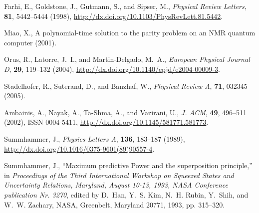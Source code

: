 \begin{thebibliography}{10}
Farhi, E., Goldstone, J., Gutmann, S., and Sipser, M., \emph{Physical Review
  Letters}, \textbf{81}, 5442--5444 (1998),
  \urlprefix\url{http://dx.doi.org/10.1103/PhysRevLett.81.5442}.

Miao, X., A polynomial-time solution to the parity problem on an {NMR} quantum
  computer (2001).

Orus, R., Latorre, J.~I., and Martin-Delgado, M.~A., \emph{European Physical
  Journal D}, \textbf{29}, 119--132 (2004),
  \urlprefix\url{http://dx.doi.org/10.1140/epjd/e2004-00009-3}.

Stadelhofer, R., Suterand, D., and Banzhaf, W., \emph{Physical Review A},
  \textbf{71}, 032345 (2005).

Ambainis, A., Nayak, A., Ta-Shma, A., and Vazirani, U., \emph{J. ACM},
  \textbf{49}, 496--511 (2002), ISSN 0004-5411,
  \urlprefix\url{http://dx.doi.org/10.1145/581771.581773}.

Summhammer, J., \emph{Physics Letters A}, \textbf{136}, 183--187 (1989),
  \urlprefix\url{http://dx.doi.org/10.1016/0375-9601(89)90557-4}.

Summhammer, J., \enquote{Maximum predictive Power and the superposition
  principle,} in \emph{Proceedings of the Third International Workshop on
  Squeezed States and Uncertainty Relations, Maryland, August 10-13, 1993, NASA
  Conference publication Nr. 3270}, edited by D.~Han, Y.~S. Kim, N.~H. Rubin,
  Y.~Shih, and W.~W. Zachary, NASA, Greenbelt, Maryland 20771, 1993, pp.
  315--320.

\end{thebibliography}




